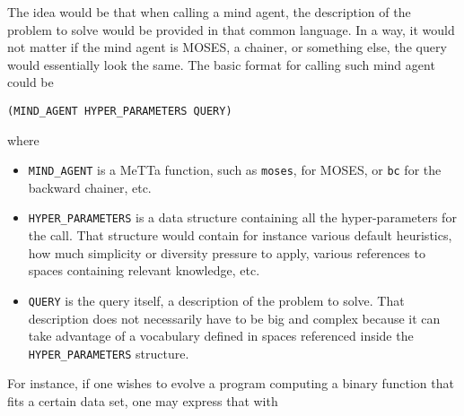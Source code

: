 \documentclass[]{report}
\begin{document}
The idea would be that when calling a mind agent, the description of
the problem to solve would be provided in that common language.  In a
way, it would not matter if the mind agent is MOSES, a chainer, or
something else, the query would essentially look the same.  The basic
format for calling such mind agent could be

\begin{verbatim}
(MIND_AGENT HYPER_PARAMETERS QUERY)
\end{verbatim}
where
\begin{itemize}
\item \texttt{MIND_AGENT} is a MeTTa function, such as
  \texttt{moses}, for MOSES, or \texttt{bc}
  for the backward chainer, etc.
\item \texttt{HYPER_PARAMETERS} is a data structure
  containing all the hyper-parameters for the call.  That structure
  would contain for instance various default heuristics, how much
  simplicity or diversity pressure to apply, various references to
  spaces containing relevant knowledge, etc.
\item \texttt{QUERY} is the query itself, a description of
  the problem to solve.  That description does not necessarily have to
  be big and complex because it can take advantage of a vocabulary
  defined in spaces referenced inside the
  \texttt{HYPER_PARAMETERS} structure.
\end{itemize}

For instance, if one wishes to evolve a program computing a binary
function that fits a certain data set, one may express that with
\end{document}
